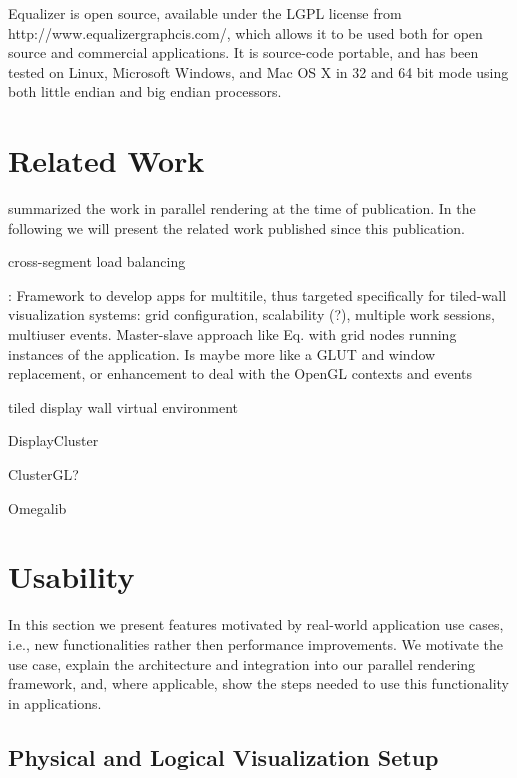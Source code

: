 \documentclass[journal]{vgtc}                %
\begin{document}
Equalizer is open source, available under the LGPL license from http://www.equalizergraphcis.com/, which allows it to be used both for open source and commercial applications. It is source-code portable, and has been tested on Linux, Microsoft Windows, and Mac OS X in 32 and 64 bit mode using both little endian and big endian processors.


\section{Related Work}
\label{SEC_related}

\cite{EMP:09} summarized the work in parallel rendering at the time of
publication. In the following we will present the related work published since
this publication.

\cite{EEP:11} cross-segment load balancing

\cite{DK:11}: Framework to develop apps for multitile, thus targeted
specifically for tiled-wall visualization systems: grid configuration,
scalability (?), multiple work sessions, multiuser events. Master-slave approach
like Eq. with grid nodes running instances of the application. Is maybe more
like a GLUT and window replacement, or enhancement to deal with the OpenGL
contexts and events

\cite{CKP:12} tiled display wall virtual environment

\cite{TBD} DisplayCluster

\cite{NHM:11} ClusterGL?

Omegalib

\section{Usability}

In this section we present features motivated by real-world application use
cases, i.e., new functionalities rather then performance improvements. We
motivate the use case, explain the architecture and integration into our
parallel rendering framework, and, where applicable, show the steps needed to
use this functionality in applications.

\subsection{Physical and Logical Visualization Setup}
\end{document}
